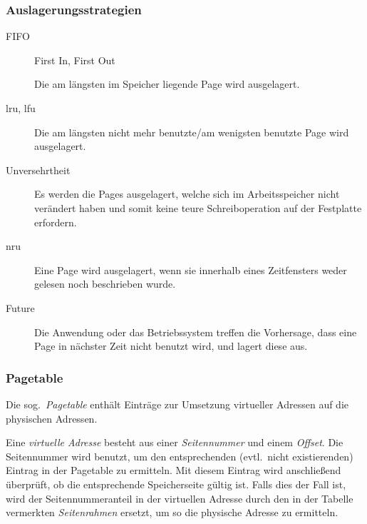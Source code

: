 \subsubsection{\label{sub:Auslagerungsstrategien}Auslagerungsstrategien}
\begin{description}
  \item [{FIFO}] 
	First In, First Out

	Die am längsten im Speicher liegende Page wird ausgelagert.

  \item [\gls{lru}, \gls{lfu}] 
	Die am längsten nicht mehr benutzte/am wenigsten benutzte Page wird ausgelagert.

  \item [{Unversehrtheit}]
	Es werden die Pages ausgelagert, welche sich im Arbeitsspeicher nicht verändert haben und somit keine teure Schreiboperation auf der Festplatte erfordern.
  \item [\gls{nru}] 
	Eine Page wird ausgelagert, wenn sie innerhalb eines Zeitfensters weder gelesen noch beschrieben wurde.
  \item [{Future}] 
	Die Anwendung oder das Betriebssystem treffen die Vorhersage, dass eine Page in nächster Zeit nicht benutzt wird, und lagert diese aus.
\end{description}

\subsubsection{Pagetable}

Die sog.~\emph{Pagetable} enthält Einträge zur Umsetzung virtueller Adressen auf die physischen Adressen.

Eine \emph{virtuelle Adresse} besteht aus einer \emph{Seitennummer} und einem \emph{Offset}.
Die Seitennummer wird benutzt, um den entsprechenden (evtl.~nicht existierenden) Eintrag in der Pagetable zu ermitteln.
Mit diesem Eintrag wird an\-schließ\-end überprüft, ob die entsprechende Speicherseite gültig ist.
Falls dies der Fall ist, wird der Seitennummeranteil in der virtuellen Adresse durch den in der Tabelle vermerkten \emph{Seitenrahmen} ersetzt, um so die physische Adresse zu ermitteln.



